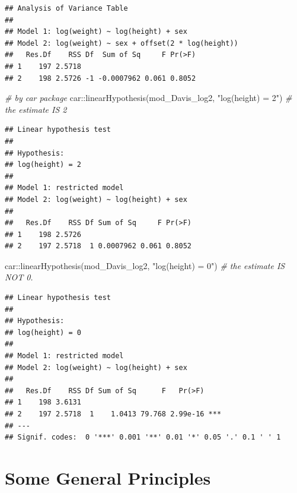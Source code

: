 \documentclass[
]{book}
\newenvironment{Shaded}{\begin{snugshade}}{\end{snugshade}}
\newcommand{\CommentTok}[1]{\textcolor[rgb]{0.56,0.35,0.01}{\textit{#1}}}
\newcommand{\FunctionTok}[1]{\textcolor[rgb]{0.00,0.00,0.00}{#1}}
\newcommand{\NormalTok}[1]{#1}
\newcommand{\SpecialCharTok}[1]{\textcolor[rgb]{0.00,0.00,0.00}{#1}}
\newcommand{\StringTok}[1]{\textcolor[rgb]{0.31,0.60,0.02}{#1}}
\begin{document}
\begin{verbatim}
## Analysis of Variance Table
## 
## Model 1: log(weight) ~ log(height) + sex
## Model 2: log(weight) ~ sex + offset(2 * log(height))
##   Res.Df    RSS Df  Sum of Sq     F Pr(>F)
## 1    197 2.5718                           
## 2    198 2.5726 -1 -0.0007962 0.061 0.8052
\end{verbatim}

\begin{Shaded}
\begin{Highlighting}[]
\CommentTok{\# by car package}
\NormalTok{car}\SpecialCharTok{::}\FunctionTok{linearHypothesis}\NormalTok{(mod\_Davis\_log2, }\StringTok{"log(height) = 2"}\NormalTok{) }\CommentTok{\# the estimate IS 2}
\end{Highlighting}
\end{Shaded}

\begin{verbatim}
## Linear hypothesis test
## 
## Hypothesis:
## log(height) = 2
## 
## Model 1: restricted model
## Model 2: log(weight) ~ log(height) + sex
## 
##   Res.Df    RSS Df Sum of Sq     F Pr(>F)
## 1    198 2.5726                          
## 2    197 2.5718  1 0.0007962 0.061 0.8052
\end{verbatim}

\begin{Shaded}
\begin{Highlighting}[]
\NormalTok{car}\SpecialCharTok{::}\FunctionTok{linearHypothesis}\NormalTok{(mod\_Davis\_log2, }\StringTok{"log(height) = 0"}\NormalTok{) }\CommentTok{\# the estimate IS NOT 0.}
\end{Highlighting}
\end{Shaded}

\begin{verbatim}
## Linear hypothesis test
## 
## Hypothesis:
## log(height) = 0
## 
## Model 1: restricted model
## Model 2: log(weight) ~ log(height) + sex
## 
##   Res.Df    RSS Df Sum of Sq      F   Pr(>F)    
## 1    198 3.6131                                 
## 2    197 2.5718  1    1.0413 79.768 2.99e-16 ***
## ---
## Signif. codes:  0 '***' 0.001 '**' 0.01 '*' 0.05 '.' 0.1 ' ' 1
\end{verbatim}

\hypertarget{some-general-principles}{%
\section{Some General Principles}\label{some-general-principles}}
\end{document}
